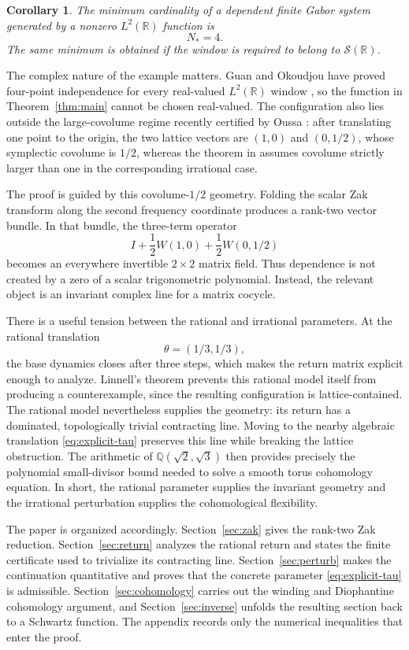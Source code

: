 \documentclass[11pt]{amsart}
\newtheorem{corollary}[theorem]{Corollary}
\theoremstyle{remark}
\newcommand{\R}{\mathbb R}
\newcommand{\Q}{\mathbb Q}
\newcommand{\cS}{\mathcal S}
\begin{document}
\begin{corollary}\label{cor:boundary}
The minimum cardinality of a dependent finite Gabor system generated by a
nonzero $L^2(\R)$ function is
\[
 \boxed{N_*=4}.
\]
The same minimum is obtained if the window is required to belong to
$\cS(\R)$.
\end{corollary}

The complex nature of the example matters.  Guan and Okoudjou have proved
four-point independence for every real-valued $L^2(\R)$ window
\cite[Corollary~1]{GuanOkoudjou26}, so the function in Theorem~\ref{thm:main} cannot be
chosen real-valued.  The configuration also lies outside the large-covolume
regime recently certified by Oussa \cite[Theorem~2.1]{Oussa26}: after translating one
point to the origin, the two lattice vectors are $(1,0)$ and $(0,1/2)$, whose
symplectic covolume is $1/2$, whereas the theorem in \cite{Oussa26} assumes
covolume strictly larger than one in the corresponding irrational case.

The proof is guided by this covolume-$1/2$ geometry.  Folding the scalar Zak
transform along the second frequency coordinate produces a rank-two vector
bundle.  In that bundle, the three-term operator
\[
 I+\frac12W(1,0)+\frac12W(0,1/2)
\]
becomes an everywhere invertible $2\times2$ matrix field.  Thus dependence is
not created by a zero of a scalar trigonometric polynomial.  Instead, the
relevant object is an invariant complex line for a matrix cocycle.

There is a useful tension between the rational and irrational parameters.
At the rational translation
\[
 \theta=(1/3,1/3),
\]
the base dynamics closes after three steps, which makes the return matrix
explicit enough to analyze.  Linnell's theorem prevents this rational model
itself from producing a counterexample, since the resulting configuration is
lattice-contained.  The rational model nevertheless supplies the geometry:
its return has a dominated, topologically trivial contracting line.  Moving
to the nearby algebraic translation \eqref{eq:explicit-tau} preserves this
line while breaking the lattice obstruction.  The arithmetic of
$\Q(\sqrt2,\sqrt3)$ then provides precisely the polynomial small-divisor bound
needed to solve a smooth torus cohomology equation.  In short, the rational
parameter supplies the invariant geometry and the irrational perturbation
supplies the cohomological flexibility.

The paper is organized accordingly.  Section~\ref{sec:zak} gives the rank-two
Zak reduction.  Section~\ref{sec:return} analyzes the rational return and
states the finite certificate used to trivialize its contracting line.
Section~\ref{sec:perturb} makes the continuation quantitative and proves that
the concrete parameter \eqref{eq:explicit-tau} is admissible.
Section~\ref{sec:cohomology} carries out the winding and Diophantine
cohomology argument, and Section~\ref{sec:inverse} unfolds the resulting
section back to a Schwartz function.  The appendix records only the numerical
inequalities that enter the proof.
\end{document}
